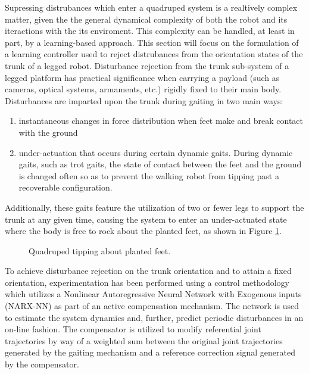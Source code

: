 		Supressing distrubances which enter a quadruped system is a realtively complex matter, given the the general dynamical complexity of both the robot and its iteractions with the its enviroment. This complexity can be handled, at least in part, by a learning-based approach. This section will focus on the formulation of a learning controller used to reject distrubances from the orientation states of the trunk of a legged robot. Disturbance rejection from the trunk sub-system of a legged platform has practical significance when carrying a payload (such as cameras, optical systems, armaments, etc.) rigidly fixed to their main body. Disturbances are imparted upon the trunk during gaiting in two main ways: 
		\begin{enumerate}
			\item instantaneous changes in force distribution when feet make and break contact with the ground 
			\item under-actuation that occurs during certain dynamic gaits. During dynamic gaits, such as trot gaits, the state of contact between the feet and the ground is changed often so as to prevent the walking robot from tipping past a recoverable configuration. 
			\end{enumerate}
		Additionally, these gaits feature the utilization of two or fewer legs to support the trunk at any given time, causing the system to enter an under-actuated state where the body is free to rock about the planted feet, as shown in Figure \ref{fig::quadruped_walking}.
			\begin{figure}[h!]
			\centering
				\caption{ Quadruped tipping about planted feet. }
				\label{fig::quadruped_walking}
			\end{figure}
		To achieve disturbance rejection on the trunk orientation and to attain a fixed orientation, experimentation has been performed using a control methodology which utilizes a Nonlinear Autoregressive Neural Network with Exogenous inputs (NARX-NN) as part of an active compensation mechanism. The network is used to estimate the system dynamics and, further, predict periodic disturbances in an on-line fashion. The compensator is utilized to modify referential joint trajectories by way of a weighted sum between the original joint trajectories generated by the gaiting mechanism and a reference correction signal generated by the compensator.

